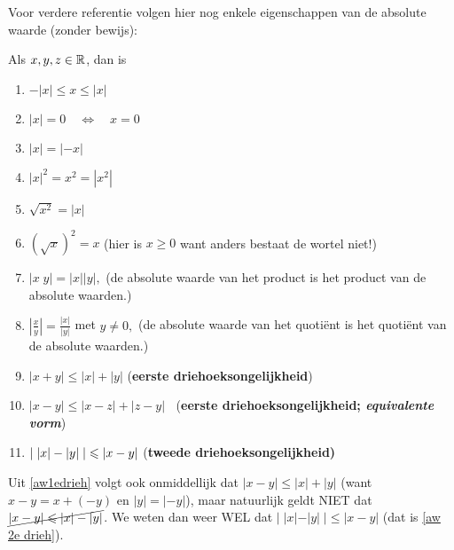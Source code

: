 \documentclass[numbers,wordchoicegiven]{ximera}
\begin{document}
Voor verdere referentie volgen hier nog enkele eigenschappen van de absolute waarde
(zonder bewijs):
\begin{proposition}\label{eig: aw}
	Als $x,y,z\in \R$, dan is
	\begin{enumerate}
		\item \label{aw tss}$-|x| \leqslant x \leqslant |x|$ 
		\item \label{aw 0}$|x|=0 \quad\Leftrightarrow \quad x=0$ 
		\item\label{aw x -x} $|x|=|-x|$
		\item \label{aw kwadr}$|x|^2=x^2=|x^2|$
		\item \label{wortel	kwadr}$\sqrt{x^2}=|x|$
		\item \label{kwadr wortel}$(\sqrt{x})^2=x$ \hfill(hier is $x \geqslant 0$
			want anders bestaat de wortel niet!)
		\item \label{aw product}$|x\;y|=|x||y|,$ \hfill(de absolute waarde van het
			product is het product van de absolute waarden.)
		\item \label{aw	quotient}$\displaystyle \left|\frac{x}{y}\right|=\frac{|x|}{|y|}$
		met $y\neq 0,$ \hfill(de absolute waarde van het quoti\"ent is
			het quoti\"ent van de absolute waarden.)
			

		\item \label{aw1edrieh}$|x+y| \leqslant|x|+|y|$ \hfill ({\bf eerste
			drie\-hoeks\-on\-ge\-lijk\-heid})
		\item \label{aw1e drieh2}$|x-y|
		\leqslant|x-z|+|z-y|\;\;$ \hfill ({\bf eerste
			drie\-hoeks\-on\-ge\-lijk\-heid;  \textit{equivalente vorm}})
		\item \label{aw 2e drieh} $\ds |\;|x|-|y|\;| \leqslant|x-y|$ \hfill
		(\bf tweede driehoeksongelijkheid)
	\end{enumerate}
\end{proposition}

\begin{remark}
Uit \ref{aw1edrieh} volgt ook onmiddellijk dat $|x-y| \leq |x|+|y|$ (want $x-y=x+(-y)$ en $|y|=|-y|$), maar natuurlijk geldt NIET dat $\cancel{|x-y| \leq |x| - |y|}$. We weten dan weer WEL dat $|\;|x|-|y|\;|\leq|x-y|$ (dat is \ref{aw 2e drieh}).
\end{remark}
\end{document}
